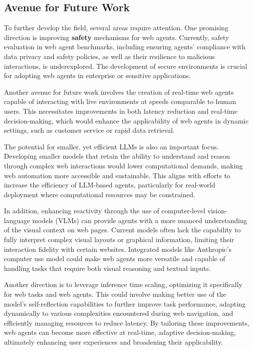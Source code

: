\documentclass[10pt]{article} %
\begin{document}
\subsection{Avenue for Future Work}

To further develop the field, several areas require attention. One promising direction is improving \textbf{safety} mechanisms for web agents. Currently, safety evaluation in web agent benchmarks, including ensuring agents' compliance with data privacy and safety policies, as well as their resilience to malicious interactions, is underexplored. The development of secure environments is crucial for adopting web agents in enterprise or sensitive applications.

Another avenue for future work involves the creation of real-time web agents capable of interacting with live environments at speeds comparable to human users. This necessitates improvements in both latency reduction and real-time decision-making, which would enhance the applicability of web agents in dynamic settings, such as customer service or rapid data retrieval.

The potential for smaller, yet efficient LLMs is also an important focus. Developing smaller models that retain the ability to understand and reason through complex web interactions would lower computational demands, making web automation more accessible and sustainable. This aligns with efforts to increase the efficiency of LLM-based agents, particularly for real-world deployment where computational resources may be constrained.

In addition, enhancing reactivity through the use of computer-level vision-language models (VLMs) can provide agents with a more nuanced understanding of the visual context on web pages. Current models often lack the capability to fully interpret complex visual layouts or graphical information, limiting their interaction fidelity with certain websites. Integrated models like Anthropic's computer use model could make web agents more versatile and capable of handling tasks that require both visual reasoning and textual inputs.

Another direction is to leverage inference time scaling, optimizing it specifically for web tasks and web agents. This could involve making better use of the model's self-reflection capabilities to further improve task performance, adapting dynamically to various complexities encountered during web navigation, and efficiently managing resources to reduce latency. By tailoring these improvements, web agents can become more effective at real-time, adaptive decision-making, ultimately enhancing user experiences and broadening their applicability.
\end{document}
